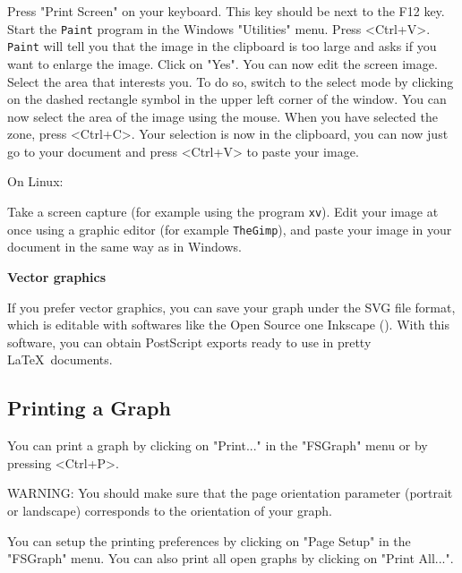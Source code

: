 \bigskip
\noindent Press "Print Screen" on your keyboard. This key should be next to the
F12 key. Start the \verb+Paint+ program in the Windows "Utilities" menu. Press
<Ctrl+V>. \verb+Paint+ will tell you that the image in the clipboard is too large
and asks if you want to enlarge the image. Click on "Yes". You can now edit the
screen image. Select the area that interests you. To do so, switch to the select
mode by clicking on the dashed rectangle symbol in the upper left corner of the
window. You can now select the area of the image using the mouse. When you have
selected the zone, press <Ctrl+C>. Your selection is now in the clipboard, you
can now just go to your document and press <Ctrl+V> to paste your image.

\bigskip
\noindent On Linux:

\bigskip
\noindent Take a screen capture (for example using the program \verb+xv+). Edit
your image at once using a graphic editor (for example \verb+TheGimp+), and paste
your image in your document in the same way as in Windows.

\newpage
\noindent\textbf{Vector graphics}

\bigskip
\noindent If you prefer vector graphics, you can save your graph under the
SVG file format, which is editable with softwares like the Open Source
one Inkscape (\cite{Inkscape}). With this software, you can obtain PostScript
exports ready to use in pretty \LaTeX~documents.

\subsection{Printing a Graph}

You can print a graph by clicking on "Print..." in the "FSGraph" menu or by
pressing <Ctrl+P>.

\bigskip
\noindent WARNING: You should make sure that the page orientation parameter
(portrait or landscape) corresponds  to the orientation of your graph.

\bigskip
\noindent You can setup the printing preferences by clicking on "Page Setup"
in the "FSGraph" menu. You can also print all open graphs by clicking on "Print
All...".


